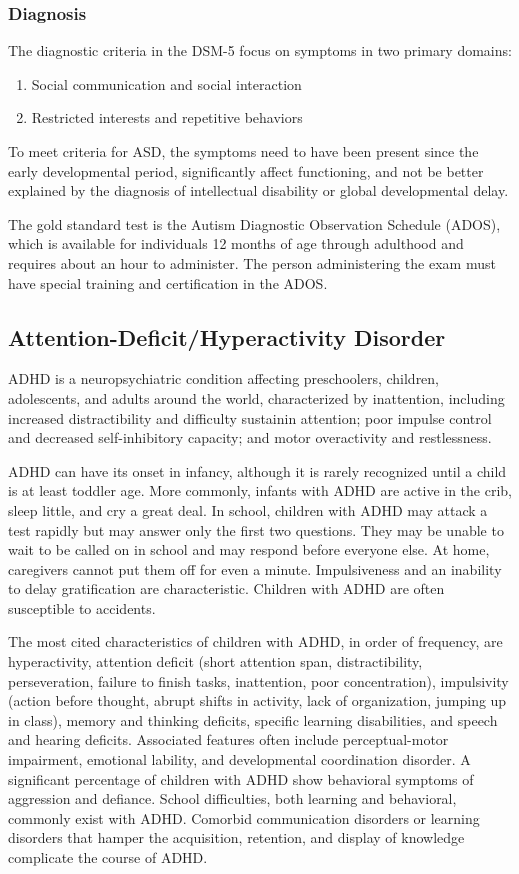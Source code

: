 \subsubsection{Diagnosis}
The diagnostic criteria in the DSM-5 focus on symptoms in two primary domains:
	\begin{enumerate}
		\item Social communication and social interaction
		\item Restricted interests and repetitive behaviors
	\end{enumerate}
To meet criteria for ASD, the symptoms need to have been present since the
early developmental period, significantly affect functioning, and not be
better explained by the diagnosis of intellectual disability or global
developmental delay. \cite{DSM5TR}

The gold standard test is the Autism Diagnostic Observation Schedule (ADOS),
which is available for individuals 12 months of age through adulthood and
requires about an hour to administer. The person administering the exam must
have special training and certification in the ADOS. \cite{Koth2023}

\subsection{Attention-Deficit/Hyperactivity Disorder}
ADHD is a neuropsychiatric condition affecting preschoolers, children, adolescents, and adults around the world, characterized by inattention, including increased distractibility and difficulty sustainin
attention; poor impulse control and decreased self-inhibitory capacity; and motor overactivity and restlessness. \cite{Boland2021-by, Nelson50}

ADHD can have its onset in infancy, although it is rarely recognized until a child is at least toddler age. More commonly, infants with ADHD are active in the crib, sleep little, and cry a great deal. In school, children with ADHD may attack a test rapidly but may answer only the first two questions. They may be unable to wait to be called on in school and may respond before everyone else. At home, caregivers cannot put them off for even a minute. Impulsiveness and an inability to delay gratification are characteristic. Children with ADHD are often susceptible to accidents. \cite{Boland2021-by}

The most cited characteristics of children with ADHD, in order of frequency, are hyperactivity, attention deficit (short attention span, distractibility, perseveration, failure to finish tasks, inattention, poor concentration), impulsivity (action before thought, abrupt shifts in activity, lack of organization, jumping up in class), memory and thinking deficits, specific learning disabilities, and speech and hearing deficits. Associated features often include perceptual-motor impairment, emotional lability, and developmental coordination disorder. A significant percentage of children with ADHD show behavioral symptoms of aggression and defiance. School difficulties, both learning and behavioral, commonly exist with ADHD. Comorbid communication disorders or learning disorders that hamper the acquisition, retention, and display of knowledge complicate the course of ADHD. \cite{Boland2021-by}

